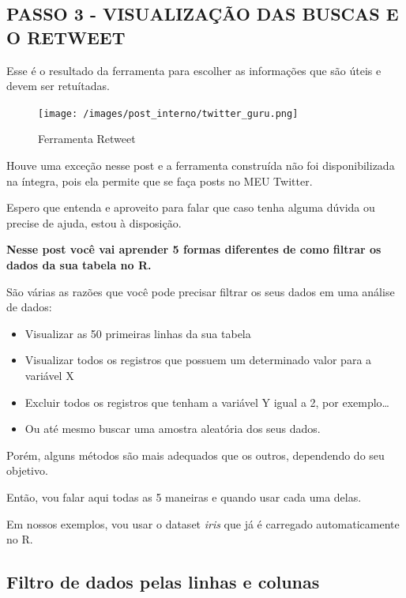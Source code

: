 \documentclass[
]{book}
\providecommand{\tightlist}{%
  \setlength{\itemsep}{0pt}\setlength{\parskip}{0pt}}
\begin{document}
\hypertarget{passo-3---visualizauxe7uxe3o-das-buscas-e-o-retweet}{%
\subsection{PASSO 3 - VISUALIZAÇÃO DAS BUSCAS E O
RETWEET}\label{passo-3---visualizauxe7uxe3o-das-buscas-e-o-retweet}}

Esse é o resultado da ferramenta para escolher as informações que são
úteis e devem ser retuítadas.

\begin{figure}
\centering
\texttt{[image: /images/post\_interno/twitter\_guru.png]}
\caption{Ferramenta Retweet}
\end{figure}

Houve uma exceção nesse post e a ferramenta construída não foi
disponibilizada na íntegra, pois ela permite que se faça posts no MEU
Twitter.

Espero que entenda e aproveito para falar que caso tenha alguma dúvida
ou precise de ajuda, estou à disposição.

\textbf{Nesse post você vai aprender 5 formas diferentes de como filtrar
os dados da sua tabela no R.}

São várias as razões que você pode precisar filtrar os seus dados em uma
análise de dados:

\begin{itemize}
\tightlist
\item
  Visualizar as 50 primeiras linhas da sua tabela
\item
  Visualizar todos os registros que possuem um determinado valor para a
  variável X
\item
  Excluir todos os registros que tenham a variável Y igual a 2, por
  exemplo\ldots{}
\item
  Ou até mesmo buscar uma amostra aleatória dos seus dados.
\end{itemize}

Porém, alguns métodos são mais adequados que os outros, dependendo do
seu objetivo.

Então, vou falar aqui todas as 5 maneiras e quando usar cada uma delas.

Em nossos exemplos, vou usar o dataset \emph{iris} que já é carregado
automaticamente no R.

\hypertarget{filtro-de-dados-pelas-linhas-e-colunas}{%
\subsection{Filtro de dados pelas linhas e
colunas}\label{filtro-de-dados-pelas-linhas-e-colunas}}
\end{document}
